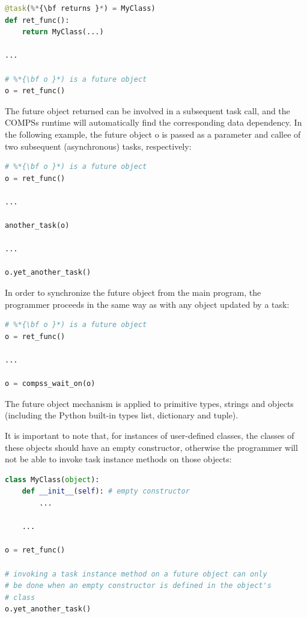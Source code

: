 \begin{lstlisting}[language=python]
@task(%*{\bf returns }*) = MyClass)
def ret_func():
    return MyClass(...)

...

# %*{\bf o }*) is a future object
o = ret_func()
\end{lstlisting}

The future object returned can be involved in a subsequent task call, and the COMPSs runtime will automatically 
find the corresponding data dependency. In the following example, the future object o is passed as a parameter 
and callee of two subsequent (asynchronous) tasks, respectively:

\begin{lstlisting}[language=python]
# %*{\bf o }*) is a future object
o = ret_func()

...

another_task(o)

...

o.yet_another_task()
\end{lstlisting}

In order to synchronize the future object from the main program, the programmer proceeds in the same way 
as with any object updated by a task:

\begin{lstlisting}[language=python]
# %*{\bf o }*) is a future object
o = ret_func()

...

o = compss_wait_on(o)
\end{lstlisting}
                         
The future object mechanism is applied to primitive types, strings and objects (including the Python 
built-in types list, dictionary and tuple).

It is important to note that, for instances of user-defined classes, the classes of these objects 
should have an empty constructor, otherwise the programmer will not be able to invoke task instance 
methods on those objects:
                                   
\begin{lstlisting}[language=python]
class MyClass(object):
    def __init__(self): # empty constructor
        ...
        
    ...

o = ret_func()

# invoking a task instance method on a future object can only
# be done when an empty constructor is defined in the object's
# class
o.yet_another_task()
\end{lstlisting}

